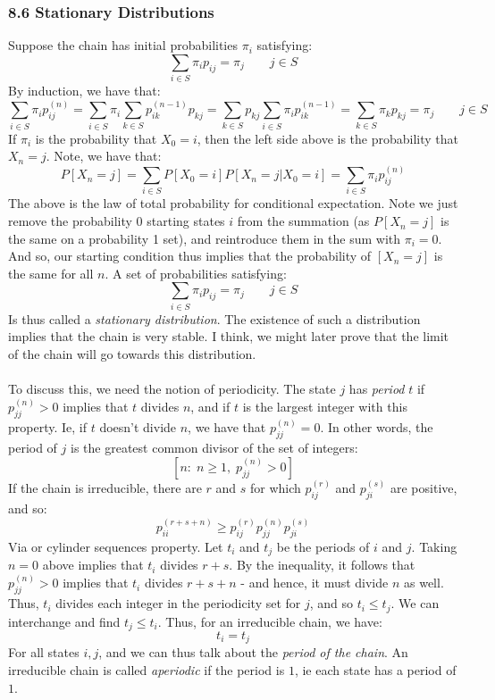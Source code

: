 \documentclass[12pt,a4paper]{article}
\newcommand{\1}[1]{\mathbbm{1}\left\{ #1 \right\}}
\begin{document}
\subsubsection{8.6 Stationary Distributions} Suppose the chain has initial probabilities $\pi_i$ satisfying:
$$
	\sum_{i \in S} \pi_i p_{ij} = \pi_j \quad\quad j \in S
$$
By induction, we have that:
$$
	\sum_{i \in S} \pi_i p_{ij}^{(n)} =
	\sum_{i \in S} \pi_i \sum_{k \in S} p_{ik}^{(n-1)}p_{kj} =
	\sum_{k \in S} p_{kj} \sum_{i \in S} \pi_i p_{ik}^{(n-1)} =
	\sum_{k \in S} \pi_k p_{kj} = \pi_j \quad\quad j \in S
$$
If $\pi_i$ is the probability that $X_0 = i$, then the left side above is the probability that $X_n = j$. Note, we have that:
$$
	P[X_n = j] = \sum_{i \in S} P[X_0 = i] P[X_n = j | X_0 = i] = \sum_{i \in S} \pi_i p_{ij}^{(n)}
$$
The above is the law of total probability for conditional expectation. Note we just remove the probability $0$ starting states $i$ from the summation (as $P[X_n = j]$ is the same on a probability 1 set), and reintroduce them in the sum with $\pi_i = 0$. And so, our starting condition thus implies that the probability of $[X_n = j]$ is the same for all $n$. A set of probabilities satisfying:
$$
	\sum_{i \in S} \pi_i p_{ij} = \pi_j \quad\quad j \in S
$$
Is thus called a \textit{stationary distribution}. The existence of such a distribution implies that the chain is very stable. I think, we might later prove that the limit of the chain will go towards this distribution.
\\\\
To discuss this, we need the notion of periodicity. The state $j$ has \textit{period} $t$ if $p_{jj}^{(n)} > 0$ implies that $t$ divides $n$, and if $t$ is the largest integer with this property. Ie, if $t$ doesn't divide $n$, we have that $p_{jj}^{(n)} = 0$. In other words, the period of $j$ is the greatest common divisor of the set of integers:
$$
	\left[n : \; n \geq 1, \; p_{jj}^{(n)} > 0\right]
$$
If the chain is irreducible, there are $r$ and $s$ for which $p_{ij}^{(r)}$ and $p_{ji}^{(s)}$ are positive, and so:
$$
	p_{ii}^{(r + s + n)} \geq p_{ij}^{(r)} p_{jj}^{(n)} p_{ji}^{(s)}
$$
Via or cylinder sequences property. Let $t_i$ and $t_j$ be the periods of $i$ and $j$. Taking $n = 0$ above implies that $t_i$ divides $r + s$. By the inequality, it follows that $p_{jj}^{(n)} > 0$ implies that $t_i$ divides $r + s + n$ - and hence, it must divide $n$ as well. Thus, $t_i$ divides each integer in the periodicity set for $j$, and so $t_i \leq t_j$. We can interchange and find $t_j \leq t_i$. Thus, for an irreducible chain, we have:
$$
	t_i = t_j
$$
For all states $i,j$, and we can thus talk about the \textit{period of the chain}. An irreducible chain is called \textit{aperiodic} if the period is $1$, ie each state has a period of $1$.
\end{document}
